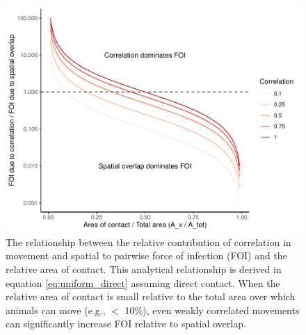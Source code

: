 \documentclass[letterpaper]{article}
\begin{document}
\begin{figure}
    \includegraphics[width=\textwidth]{figures/correlation_analytical_figure.pdf}
    \caption{The relationship between the relative contribution of correlation in movement and spatial to pairwise force of infection (FOI) and the relative area of contact. This analytical relationship is derived in equation \ref{eq:uniform_direct} assuming direct contact.  When the relative area of contact is small relative to the total area over which animals can move (e.g., $<$ 10\%), even weakly correlated movements can significantly increase FOI relative to spatial overlap.}
    \label{fig:analytical_corr}
\end{figure}
\end{document}
